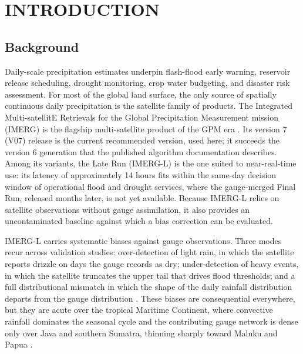 %

\chapter{INTRODUCTION}\label{chap:introduction}

\section{Background}\label{sec:intro-background}

Daily-scale precipitation estimates underpin flash-flood early
warning, reservoir release scheduling, drought monitoring, crop
water budgeting, and disaster risk assessment. For most of the
global land surface, the only source of spatially continuous
daily precipitation is the satellite family of products. The
Integrated Multi-satellitE Retrievals for the Global
Precipitation Measurement mission (IMERG) is the flagship
multi-satellite product of the GPM era
\citep{ref:hou2014, ref:huffman2020}. Its version 7 (V07)
release is the current recommended version, used here; it
succeeds the version 6 generation that the published algorithm
documentation describes. Among its variants,
the Late Run (IMERG-L) is the one suited to near-real-time use:
its latency of approximately 14 hours fits within the same-day
decision window of operational flood and drought services, where
the gauge-merged Final Run, released months later, is not yet
available. Because IMERG-L relies on satellite observations
without gauge assimilation, it also provides an uncontaminated
baseline against which a bias correction can be evaluated.

IMERG-L carries systematic biases against gauge observations.
Three modes recur across validation studies: over-detection of
light rain, in which the satellite reports drizzle on days the
gauge records as dry; under-detection of heavy events, in which
the satellite truncates the upper tail that drives flood
thresholds; and a full distributional mismatch in which the
shape of the daily rainfall distribution departs from the gauge
distribution \citep{ref:maggioni2016, ref:tang2020}. These biases
are consequential everywhere, but they are acute over the
tropical Maritime Continent, where convective rainfall dominates
the seasonal cycle and the contributing gauge network is dense
only over Java and southern Sumatra, thinning sharply toward
Maluku and Papua \citep{ref:chen2008, ref:rahmawati2021, ref:ramadhan2022, ref:mashuri2025}.

